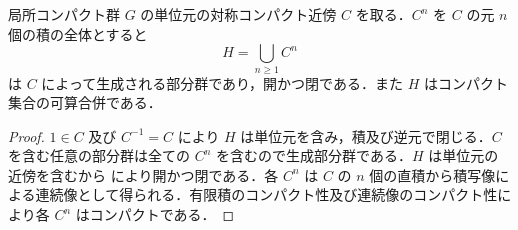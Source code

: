 \begin{prop}[コンパクト集合で生成される開部分群]
局所コンパクト群 $G$ の単位元の対称コンパクト近傍 $C$ を取る．$C^n$ を $C$ の元 $n$ 個の積の全体とすると
\[
 H=\bigcup_{n\geq1}C^n
\]
は $C$ によって生成される部分群であり，開かつ閉である．また $H$ はコンパクト集合の可算合併である．
\end{prop}
\begin{proof}
$1\in C$ 及び $C^{-1}=C$ により $H$ は単位元を含み，積及び逆元で閉じる．$C$ を含む任意の部分群は全ての $C^n$ を含むので生成部分群である．$H$ は単位元の近傍を含むから により開かつ閉である．各 $C^n$ は $C$ の $n$ 個の直積から積写像による連続像として得られる．有限積のコンパクト性及び連続像のコンパクト性により各 $C^n$ はコンパクトである．
\end{proof}
